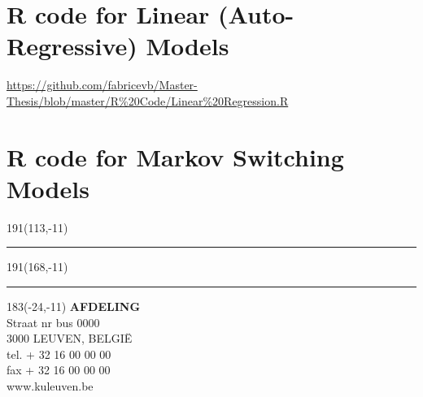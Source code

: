\documentclass[12pt,a4paper,oneside]{book}
\begin{document}
\section*{R code for Linear (Auto-Regressive) Models}


\url{https://github.com/fabricevb/Master-Thesis/blob/master/R%20Code/Linear%20Regression.R}


\section*{R code for Markov Switching Models}

\newpage

\thispagestyle{empty}
\sffamily
%
\begin{textblock}{191}(113,-11)
{\color{blueline}\rule{160pt}{5.5pt}}
\end{textblock}
%
\begin{textblock}{191}(168,-11)
{\color{blueline}\rule{5.5pt}{59pt}}
\end{textblock}
%
\begin{textblock}{183}(-24,-11)
\textblockcolour{}
\flushright
\fontsize{7}{7.5}\selectfont
\textbf{AFDELING}\\
Straat nr bus 0000\\
3000 LEUVEN, BELGI\"{E}\\
tel. + 32 16 00 00 00\\
fax + 32 16 00 00 00\\
www.kuleuven.be\\
\end{textblock}
%
\end{document}
